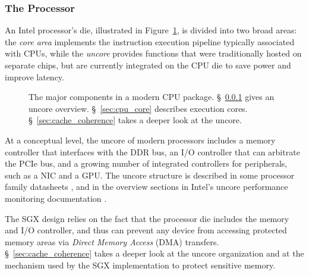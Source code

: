 \subsubsection{The Processor}
\label{sec:cpu_die}

An Intel processor's die, illustrated in Figure~\ref{fig:cpu_die}, is divided
into two broad areas: the \textit{core area} implements the instruction
execution pipeline typically associated with CPUs, while the \textit{uncore}
provides functions that were traditionally hosted on separate chips, but are
currently integrated on the CPU die to save power and improve latency.

\begin{figure}[hbt]
  \caption{
    The major components in a modern CPU package. \S~\ref{sec:cpu_die} gives
    an uncore overview. \S~\ref{sec:cpu_core} describes execution cores.
    \S~\ref{sec:cache_coherence} takes a deeper look at the uncore.
  }
  \label{fig:cpu_die}
\end{figure}


At a conceptual level, the uncore of modern processors includes a memory
controller that interfaces with the DDR bus, an I/O controller that can
arbitrate the PCIe bus, and a growing number of integrated controllers for
peripherals, such as a NIC and a GPU. The uncore structure is described in some
processor family datasheets \cite{intel2014datasheet, intel2010datasheet}, and
in the overview sections in Intel's uncore performance monitoring documentation
\cite{intel2014uncore, intel2012uncore, intel2010uncore}.

The SGX design relies on the fact that the processor die includes the memory
and I/O controller, and thus can prevent any device from accessing protected
memory areas via \textit{Direct Memory Access} (DMA) transfers.
\S~\ref{sec:cache_coherence} takes a deeper look at the uncore organization and
at the mechanism used by the SGX implementation to protect sensitive memory.


